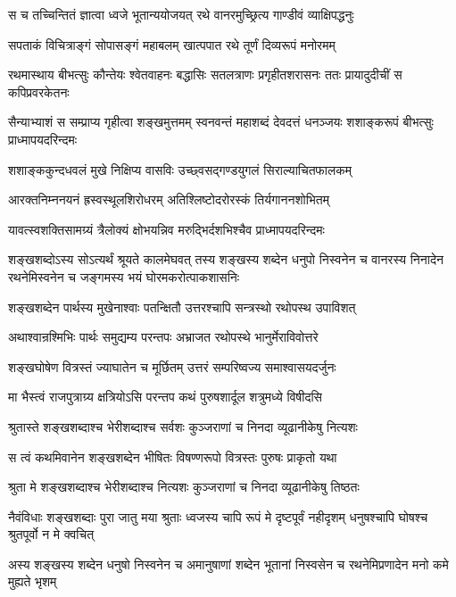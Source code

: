 \twolineshloka
{स च तच्चिन्तितं ज्ञात्वा ध्वजे भूतान्ययोजयत्}
{रथे वानरमुच्छ्रित्य गाण्डीवं व्याक्षिपद्धनुः}


\twolineshloka
{सपताकं विचित्राङ्गं सोपासङ्गं महाबलम्}
{खात्पपात रथे तूर्णं दिव्यरूपं मनोरमम्}


\threelineshloka
{रथमास्थाय बीभत्सुः कौन्तेयः श्वेतवाहनः}
{बद्धासिः सतलत्राणः प्रगृहीतशरासनः}
{ततः प्रायादुदीचीं स कपिप्रवरकेतनः}


\threelineshloka
{सैन्याभ्याशं स सम्प्राप्य गृहीत्वा शङ्खमुत्तमम्}
{स्वनवन्तं महाशब्दं देवदत्तं धनञ्जयः}
{शशाङ्करूपं बीभत्सुः प्राध्मापयदरिन्दमः}


\twolineshloka
{शशाङ्ककुन्दधवलं मुखे निक्षिप्य वासविः}
{उच्छ्वसद्गण्डयुगलं सिराल्याचितफालकम्}


\twolineshloka
{आरक्तनिम्ननयनं ह्रस्वस्थूलशिरोधरम्}
{अतिश्लिष्टोदरोरस्कं तिर्यगाननशोभितम्}


\twolineshloka
{यावत्स्वशक्तिसामग्र्यं त्रैलोक्यं क्षोभयन्निव}
{मरुद्भिर्दशभिश्चैव प्राध्मापयदरिन्दमः}


\onelineshloka
{शङ्खशब्दोऽस्य सोऽत्यर्थं श्रूयते कालमेघवत्}
\threelineshloka
{तस्य शङ्खस्य शब्देन धनुपो निस्वनेन च}
{वानरस्य निनादेन रथनेमिस्वनेन च}
{जङ्गमस्य भयं घोरमकरोत्पाकशासनिः}


\twolineshloka
{शङ्खशब्देन पार्थस्य मुखेनाश्वाः पतन्क्षितौ}
{उत्तरश्चापि सन्त्रस्थो रथोपस्थ उपाविशत्}


\twolineshloka
{अथाश्वान्रश्मिभिः पार्थः समुद्यम्य परन्तपः}
{अभ्राजत रथोपस्थे भानुर्मेराविवोत्तरे}


\twolineshloka
{शङ्खघोषेण वित्रस्तं ज्याघातेन च मूर्छितम्}
{उत्तरं सम्परिष्वज्य समाश्वासयदर्जुनः}


\twolineshloka
{मा भैस्त्वं राजपुत्राग्र्य क्षत्रियोऽसि परन्तप}
{कथं पुरुषशार्दूल शत्रुमध्ये विषीदसि}


\twolineshloka
{श्रुतास्ते शङ्खशब्दाश्च भेरीशब्दाश्च सर्वशः}
{कुञ्जराणां च निनदा व्यूढानीकेषु नित्यशः}


\twolineshloka
{स त्वं कथमिवानेन शङ्खशब्देन भीषितः}
{विषण्णरूपो वित्रस्तः पुरुषः प्राकृतो यथा}




\twolineshloka
{श्रुता मे शङ्खशब्दाश्च भेरीशब्दाश्च नित्यशः}
{कुञ्जराणां च निनदा व्यूढानीकेषु तिष्ठतः}


\threelineshloka
{नैवंविधाः शङ्खशब्दाः पुरा जातु मया श्रुताः}
{ध्वजस्य चापि रूपं मे दृष्टपूर्वं नहीदृशम्}
{धनुषश्चापि घोषश्च श्रुतपूर्वो न मे क्वचित्}


\threelineshloka
{अस्य शङ्खस्य शब्देन धनुषो निस्वनेन च}
{अमानुषाणां शब्देन भूतानां निस्वसेन च}
{रथनेमिप्रणादेन मनो कमे मुह्यते भृशम्}


